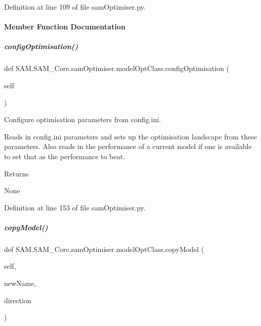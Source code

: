Definition at line 109 of file sam\+Optimiser.\+py.



\paragraph{Member Function Documentation}
\mbox{\label{group__icubclient__SAM__Core_a3595941adaf6ec042054272648e778e5}} 
\subparagraph{\texorpdfstring{config\+Optimisation()}{configOptimisation()}}
{\footnotesize\ttfamily def S\+A\+M.\+S\+A\+M\+\_\+\+Core.\+sam\+Optimiser.\+model\+Opt\+Class.\+config\+Optimisation (\begin{DoxyParamCaption}\item[{}]{self }\end{DoxyParamCaption})}



Configure optimisation parameters from config.\+ini. 

Reads in config.\+ini parameters and sets up the optimisation landscape from these parameters. Also reads in the performance of a current model if one is available to set that as the performance to beat.

\begin{DoxyReturn}{Returns}


None 
\end{DoxyReturn}


Definition at line 153 of file sam\+Optimiser.\+py.

\mbox{\label{group__icubclient__SAM__Core_a578d3f753546bcfbc1cbe94aa34a0f68}} 
\subparagraph{\texorpdfstring{copy\+Model()}{copyModel()}}
{\footnotesize\ttfamily def S\+A\+M.\+S\+A\+M\+\_\+\+Core.\+sam\+Optimiser.\+model\+Opt\+Class.\+copy\+Model (\begin{DoxyParamCaption}\item[{}]{self,  }\item[{}]{new\+Name,  }\item[{}]{direction }\end{DoxyParamCaption})}



